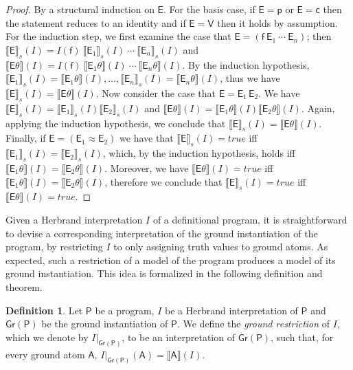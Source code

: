 \documentclass[submission,copyright]{eptcs}
\theoremstyle{definition}
\newtheorem{definition}{Definition}
\newcommand{\mwrt}[2]{\llbracket#1\rrbracket(#2)}
\newcommand{\mwrs}[3]{\llbracket#1\rrbracket_{#3}(#2)}
\begin{document}
\begin{proof}
By a structural induction on $\mathsf{E}$. For the basis case, if
$\mathsf{E}=\mathsf{p}$ or $\mathsf{E}=\mathsf{c}$ then
the statement reduces to an identity and if $\mathsf{E}=\mathsf{V}$
then it holds by assumption. For the induction step, we first examine the case that $\mathsf{E}= (\mathsf{f}\ \mathsf{E}_1\ \cdots\ \mathsf{E}_n)$;
then $\mwrs{\mathsf{E}}{I}{s} = I(\mathsf{f})\  \mwrs{\mathsf{E}_1}{I}{s} \ \cdots\  \mwrs{\mathsf{E}_n}{I}{s}$
and $\mwrt{\mathsf{E}\theta}{I} = I(\mathsf{f})\ \mwrt{\mathsf{E}_1\theta}{I}\ \cdots\  \mwrt{\mathsf{E}_n\theta}{I}$.
By the induction hypothesis, $\mwrs{\mathsf{E}_1}{I}{s} =
\mwrt{\mathsf{E}_1\theta}{I}, \ldots, \mwrs{\mathsf{E}_n}{I}{s} =
\mwrt{\mathsf{E}_n\theta}{I}$, thus we have
$\mwrs{\mathsf{E}}{I}{s} = \mwrt{\mathsf{E}\theta}{I}$.
Now consider the case that $\mathsf{E}= \mathsf{E}_1\,\mathsf{E}_2$.
We have $\mwrs{\mathsf{E}}{I}{s} = \mwrs{\mathsf{E}_1}{I}{s}\mwrs{\mathsf{E}_2}{I}{s}$
and $\mwrt{\mathsf{E}\theta}{I} = \mwrt{\mathsf{E}_1\theta}{I}\mwrt{\mathsf{E}_2\theta}{I}$.
Again, applying the induction hypothesis, we conclude that
$\mwrs{\mathsf{E}}{I}{s} = \mwrt{\mathsf{E}\theta}{I}$.
Finally, if $\mathsf{E} = (\mathsf{E}_1\approx \mathsf{E}_2)$
we have that $\mwrs{\mathsf{E}}{I}{s}=true$ iff $\mwrs{\mathsf{E}_1}{I}{s}=\mwrs{\mathsf{E}_2}{I}{s}$,
which, by the induction hypothesis, holds iff
$\mwrt{\mathsf{E}_1\theta}{I}=\mwrt{\mathsf{E}_2\theta}{I}$.
Moreover, we have $\mwrt{\mathsf{E}\theta}{I}=true$ iff
$\mwrt{\mathsf{E}_1\theta}{I}=\mwrt{\mathsf{E}_2\theta}{I}$,
therefore we conclude that $\mwrs{\mathsf{E}}{I}{s}=true$ iff
$\mwrt{\mathsf{E}\theta}{I}=true$.
\end{proof}

{Given a Herbrand interpretation $I$ of a definitional program, it is straightforward to
devise a corresponding interpretation of the ground instantiation of the program,
by restricting $I$ to only assigning truth values to ground atoms. As expected,
such a restriction of a model of the program produces a model of its ground
instantiation. This idea is formalized in the following definition and theorem.}
\begin{definition}
Let $\mathsf{P}$ be a program, $I$ be a Herbrand interpretation of $\mathsf{P}$ and $\mathsf{Gr(P)}$
be the ground instantiation of $\mathsf{P}$. We define the \emph{ground restriction}
of $I$, which we denote by $I|_{\mathsf{Gr(P)}}$, to be an interpretation of
$\mathsf{Gr(P)}$, such that, for every ground atom
$\mathsf{A}$, $I|_{\mathsf{Gr(P)}}(\mathsf{A}) = \mwrt{\mathsf{A}}{I}$.
\end{definition}
\end{document}
